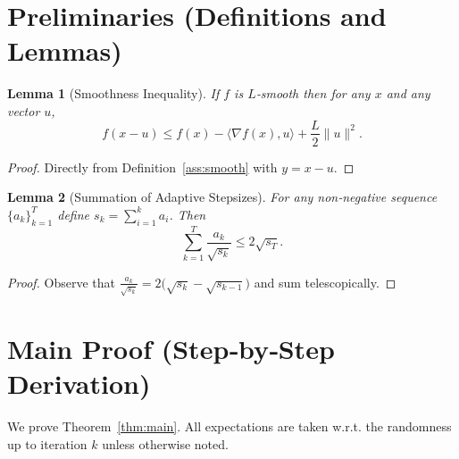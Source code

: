 \documentclass{article}
\newtheorem{lemma}{Lemma}
\newcommand{\grad}{\nabla}
\begin{document}
\vspace{1em}
\section*{Preliminaries (Definitions and Lemmas)}
\begin{lemma}[Smoothness Inequality]\label{lem:smooth}
If $f$ is $L$‑smooth then for any $x$ and any vector $u$,
\[
f(x-u)\le f(x)-\langle\grad f(x),u\rangle+\frac{L}{2}\|u\|^{2}.
\]
\end{lemma}
\begin{proof}
Directly from Definition~\ref{ass:smooth} with $y=x-u$.
\end{proof}

\begin{lemma}[Summation of Adaptive Stepsizes]\label{lem:sum_eta}
For any non‑negative sequence $\{a_{k}\}_{k=1}^{T}$ define $s_{k}=\sum_{i=1}^{k}a_{i}$. Then
\[
\sum_{k=1}^{T}\frac{a_{k}}{\sqrt{s_{k}}}\le 2\sqrt{s_{T}}.
\]
\end{lemma}
\begin{proof}
Observe that $\frac{a_{k}}{\sqrt{s_{k}}}=2\big(\sqrt{s_{k}}-\sqrt{s_{k-1}}\big)$ and sum telescopically.
\end{proof}

\vspace{0.5em}
\section*{Main Proof (Step‑by‑Step Derivation)}
We prove Theorem~\ref{thm:main}. All expectations are taken w.r.t. the randomness up to iteration $k$ unless otherwise noted.
\end{document}
